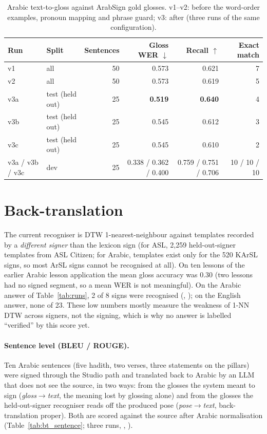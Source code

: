 \begin{table}[ht]
\centering\small
\caption{Arabic text-to-gloss against ArabSign gold glosses. v1--v2: before the word-order examples, pronoun mapping and
phrase guard; v3: after (three runs of the same configuration).}
\label{tab:arabsign}
\begin{tabular}{l l r r r r}
\toprule
Run & Split & Sentences & Gloss WER $\downarrow$ & Recall $\uparrow$ & Exact match \\
\midrule
v1 & all & 50 & 0.573 & 0.621 & 7 \\
v2 & all & 50 & 0.573 & 0.619 & 5 \\
v3a & test (held out) & 25 & \textbf{0.519} & \textbf{0.640} & 4 \\
v3b & test (held out) & 25 & 0.545 & 0.612 & 3 \\
v3c & test (held out) & 25 & 0.545 & 0.610 & 2 \\
v3a / v3b / v3c & dev & 25 & 0.338 / 0.362 / 0.400 & 0.759 / 0.751 / 0.706 & 10 / 10 / 10 \\
\bottomrule
\end{tabular}
\end{table}

\section{Back-translation}
\label{sec:backtranslation}
The current recogniser is DTW 1-nearest-neighbour against templates recorded by a \emph{different signer} than the
lexicon sign (for ASL, 2,259 held-out-signer templates from ASL Citizen; for Arabic, templates exist only for the 520
KArSL signs, so most ArSL signs cannot be recognised at all). On ten lessons of the earlier Arabic lesson application
the mean gloss accuracy was 0.30 (two lessons had no signed segment, so a mean WER is not meaningful). On the Arabic
answer of Table~\ref{tab:runs}, 2 of 8 signs were recognised (, ); on the English answer, none of
23. These low numbers mostly measure the weakness of 1-NN DTW across signers, not the signing, which is why no answer is
labelled ``verified'' by this score yet.

\paragraph{Sentence level (BLEU / ROUGE).} Ten Arabic sentences (five hadith, two verses, three statements on the
pillars) were signed through the Studio path and translated back to Arabic by an LLM that does not see the source, in
two ways: from the glosses the system meant to sign (\emph{gloss$\rightarrow$text}, the meaning lost by glossing alone)
and from the glosses the held-out-signer recogniser reads off the produced pose (\emph{pose$\rightarrow$text},
back-translation proper). Both are scored against the source after Arabic normalisation (Table~\ref{tab:bt_sentence};
three runs, , ).

